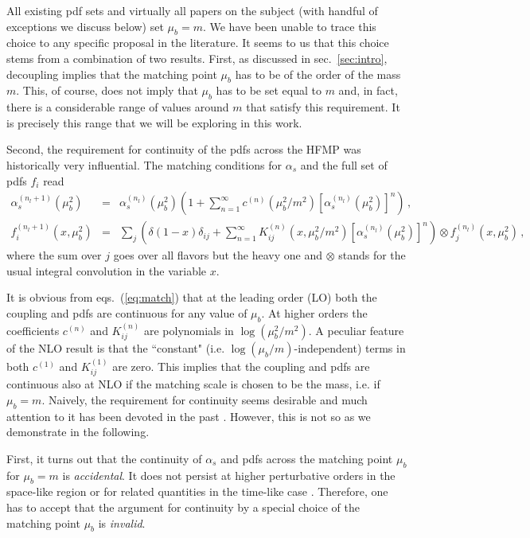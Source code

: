 \documentclass[letter,11pt]{article}
\def\as{\alpha_s}
\def\nl{{n_l}}
\def\mub{\mu_b}
\begin{document}
All existing pdf sets and virtually all papers on the subject (with handful of exceptions we discuss below) set $\mub=m$. We have been unable to trace this choice to any specific proposal in the literature. It seems to us that this choice stems from a combination of two results. First, as discussed in sec.~\ref{sec:intro}, decoupling implies that the matching point $\mub$ has to be of the order of the mass $m$. This, of course, does not imply that $\mub$ has to be set equal to $m$ and, in fact, there is a considerable range of values around $m$ that satisfy this requirement. It is precisely this range that we will be exploring in this work. 

Second, the requirement for continuity of the pdfs across the HFMP was historically very influential. The matching conditions for $\as$ and the full set of pdfs $f_i$ read
%
\begin{eqnarray}
\as^{(\nl+1)}(\mub^2)&=&\as^{(\nl)}(\mub^2)\left(1+\sum_{n=1}^{\infty}c^{(n)}(\mub^2/m^2)\left[\alpha_s^{(\nl)}(\mub^2)\right]^n \right)\,, \label{eq:match}\\
f^{(\nl+1)}_i(x,\mub^2)&=& \sum_j\left(\delta(1-x)\delta_{ij} + \sum_{n=1}^{\infty} K^{(n)}_{ij}(x,\mub^2/m^2)\left[\alpha_s^{(\nl)}(\mub^2)\right]^n \right)\otimes f_j^{(\nl)}(x,\mub^2)\,,\nonumber
\end{eqnarray}
%
where the sum over $j$ goes over all flavors but the heavy one and $\otimes$ stands for the usual integral convolution in the variable $x$.

It is obvious from eqs.~(\ref{eq:match}) that at the leading order (LO) both the coupling and pdfs are continuous for any value of $\mub$. At higher orders the coefficients $c^{(n)}$ and $K^{(n)}_{ij}$ are polynomials in $\log(\mub^2/m^2)$. A peculiar feature of the NLO result is that the ``constant" (i.e. $\log(\mub/m)$-independent) terms in both $c^{(1)}$ and $K^{(1)}_{ij}$ are zero. This implies that the coupling and pdfs are continuous also at NLO if the matching scale is chosen to be the mass, i.e. if $\mub=m$. Naively, the requirement for continuity seems desirable and much attention to it has been devoted in the past \cite{Thorne:1997ga,Thorne:1997uu}. However, this is not so as we demonstrate in the following.

First, it turns out that the continuity of $\as$ and pdfs across the matching point $\mub$ for $\mub=m$ is {\it accidental}. It does not persist at higher perturbative orders in the space-like region \cite{Buza:1995ie,Buza:1996wv} or for related quantities in the time-like case \cite{Cacciari:2005ry,Mele:1990cw,Melnikov:2004bm,Mitov:2004du}. Therefore, one has to accept that the argument for continuity by a special choice of the matching point $\mub$ is {\it invalid}. 
\end{document}
